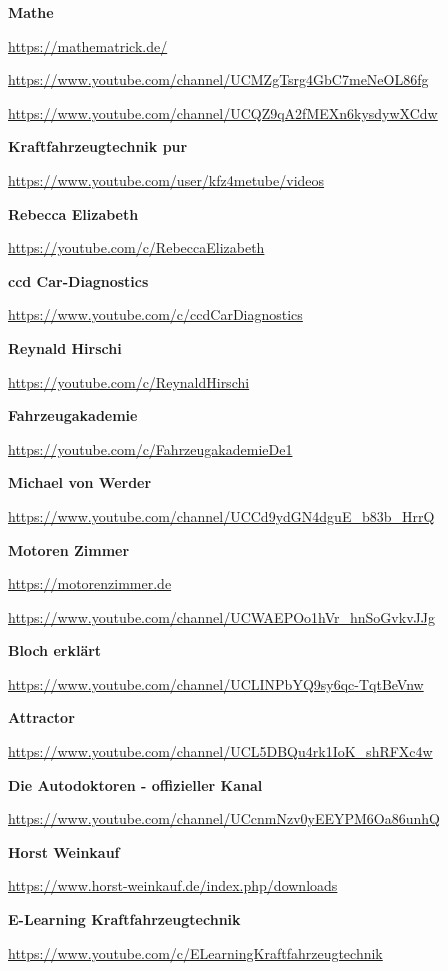 \textbf{Mathe}

\url{https://mathematrick.de/}

\url{https://www.youtube.com/channel/UCMZgTsrg4GbC7meNeOL86fg}

\url{https://www.youtube.com/channel/UCQZ9qA2fMEXn6kysdywXCdw}

\textbf{Kraftfahrzeugtechnik pur}

\url{https://www.youtube.com/user/kfz4metube/videos}

\textbf{Rebecca Elizabeth}

\url{https://youtube.com/c/RebeccaElizabeth}

\textbf{ccd Car-Diagnostics}

\url{https://www.youtube.com/c/ccdCarDiagnostics}

\textbf{Reynald Hirschi}

\url{https://youtube.com/c/ReynaldHirschi}

\textbf{Fahrzeugakademie}

\url{https://youtube.com/c/FahrzeugakademieDe1}

\textbf{Michael von Werder}

\url{https://www.youtube.com/channel/UCCd9ydGN4dguE_b83b_HrrQ}

\textbf{Motoren Zimmer}

\url{https://motorenzimmer.de}

\url{https://www.youtube.com/channel/UCWAEPOo1hVr_hnSoGvkvJJg}

\textbf{Bloch erklärt}

\url{https://www.youtube.com/channel/UCLINPbYQ9sy6qc-TqtBeVnw}

\textbf{Attractor}

\url{https://www.youtube.com/channel/UCL5DBQu4rk1IoK_shRFXc4w}

\textbf{Die Autodoktoren - offizieller Kanal}

\url{https://www.youtube.com/channel/UCcnmNzv0yEEYPM6Oa86unhQ}

\textbf{Horst Weinkauf}

\url{https://www.horst-weinkauf.de/index.php/downloads}

\textbf{E-Learning Kraftfahrzeugtechnik}

\url{https://www.youtube.com/c/ELearningKraftfahrzeugtechnik}
